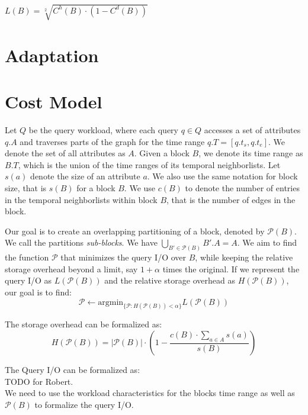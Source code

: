 \documentclass{sig-alternate}
\begin{document}
$L(B) = \sqrt[2]{C^h(B) \cdot ( 1 - C^d(B))}$



\section{Adaptation}

\section{Cost Model}

Let $Q$ be the query workload, where each query $q\in Q$ accesses a set of
attributes $q.A$ and traverses parts of the graph for the time range
$q.T=[q.t_s,q.t_e]$. We denote the set of all attributes as $A$. Given a block
$B$, we denote its time range as $B.T$, which is the union of the time ranges
of its temporal neighborlists. Let $s(a)$ denote the size of an attribute $a$.
We also use the same notation for block size, that is $s(B)$ for a block $B$. 
We use $c(B)$ to denote the number of entries in the temporal neighborlists
within block $B$, that is the number of edges in the block. 

Our goal is to create an overlapping partitioning of a block, denoted by
$\mathcal{P}(B)$. We call the partitions \emph{sub-blocks}. We have
$\bigcup_{B'\in \mathcal{P}(B)} B'.A = A$. We aim to find the function
$\mathcal{P}$ that minimizes the query I/O over $B$, while keeping the
relative storage overhead beyond a limit, say $1+\alpha$ times the original.
If we represent the query I/O as $L(\mathcal{P}(B))$ and the relative storage
overhead as $H(\mathcal{P}(B))$, our goal is to find:
\begin{equation}
\mathcal{P} \leftarrow \mbox{argmin}_{\{\mathcal{P}: H(\mathcal{P}(B)) < \alpha\}} L(\mathcal{P}(B))
\end{equation}

The storage overhead can be formalized as:
\begin{equation}
H(\mathcal{P}(B)) = |\mathcal{P}(B)|\cdot\left(1-\frac{c(B)\cdot \sum_{a\in A} s(a)}{s(B)}\right) 
\end{equation}

The Query I/O can be formalized as:\\
TODO for Robert.\\
We need to use the workload characteristics for the blocks time range as
well as $\mathcal{P}(B)$ to formalize the query I/O.\\



 
\end{document}
